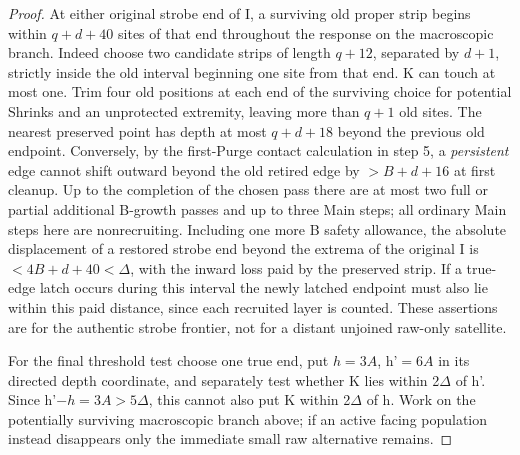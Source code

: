 \begin{proof}
At either original strobe end of I, a surviving old proper strip begins within \(q+d+40\) sites of that end throughout the response on the macroscopic branch. Indeed choose two candidate strips of length \(q+12\), separated by \(d+1\), strictly inside the old interval beginning one site from that end. K can touch at most one. Trim four old positions at each end of the surviving choice for potential Shrinks and an unprotected extremity, leaving more than \(q+1\) old sites. The nearest preserved point has depth at most \(q+d+18\) beyond the previous old endpoint. Conversely, by the first-Purge contact calculation in step 5, a \emph{persistent} edge cannot shift outward beyond the old retired edge by \(>B+d+16\) at first cleanup. Up to the completion of the chosen pass there are at most two full or partial additional B-growth passes and up to three Main steps; all ordinary Main steps here are nonrecruiting. Including one more B safety allowance, the absolute displacement of a restored strobe end beyond the extrema of the original I is \(<4B+d+40<\Delta \), with the inward loss paid by the preserved strip. If a true-edge latch occurs during this interval the newly latched endpoint must also lie within this paid distance, since each recruited layer is counted. These assertions are for the authentic strobe frontier, not for a distant unjoined raw-only satellite.

For the final threshold test choose one true end, put \(h=3A\), h'\(=6A\) in its directed depth coordinate, and separately test whether K lies within 2\(\Delta\) of h'. Since h'\(- h=3A>5\Delta \), this cannot also put K within 2\(\Delta\) of h. Work on the potentially surviving macroscopic branch above; if an active facing population instead disappears only the immediate small raw alternative remains.


\end{proof}
